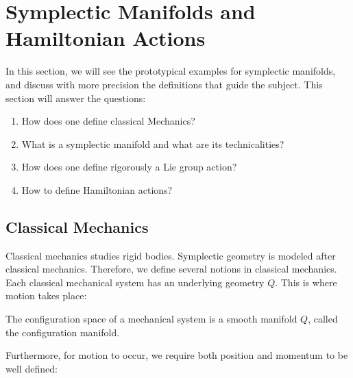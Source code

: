 

\theoremstyle{plain} %
\newtheorem{theorem}{Theorem}[section]
\newtheorem{prop}[theorem]{Proposition}
\newtheorem{lemma}[theorem]{Lemma}
\newtheorem{cor}[theorem]{Corollary}
\newtheorem{conj}[theorem]{Conjecture}
\newtheorem*{claim}{Claim}
\newtheorem*{question}{Question}
\newtheorem*{conv}{Convention}

\theoremstyle{remark}
\newtheorem{exr}{Exercise}
\newtheorem*{rmk}{Remark}

\theoremstyle{defn}

\newtheorem*{FTA}{Fundamental Theorem of Algebra}


\section{Symplectic Manifolds and Hamiltonian Actions}

In this section, we will see the prototypical examples for symplectic manifolds, and discuss with more precision the definitions that guide the subject. This section will answer the questions:

\begin{enumerate}
    \item How does one define classical Mechanics?
    \item What is a symplectic manifold and what are its technicalities?
    \item How does one define rigorously a Lie group action?
    \item How to define Hamiltonian actions?
\end{enumerate}

\subsection{Classical Mechanics}
Classical mechanics studies rigid bodies. Symplectic geometry is modeled after classical mechanics. Therefore, we define several notions in classical mechanics. Each classical mechanical system has an underlying geometry $Q$. This is where motion takes place:

\begin{defn}
The configuration space of a mechanical system is a smooth manifold $Q$, called the configuration manifold. 
\end{defn}

\noindent Furthermore, for motion to occur, we require both position and momentum to be well defined:

